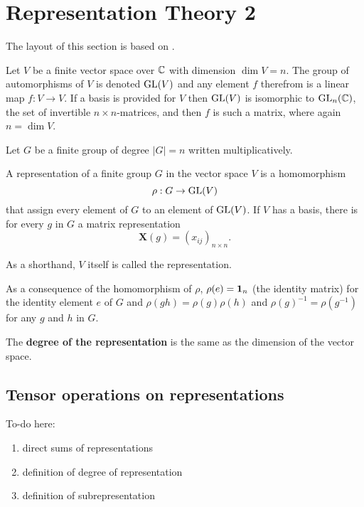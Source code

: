 	\clearpage{\thispagestyle{empty}}
\section{Representation Theory 2}

The layout of this section is based on \cite{Serre}.

Let $V$ be a finite vector space over $\mathbb{C}$ with dimension $\dim V = n$. The group of automorphisms of $V$ is denoted $\text{GL}(V)$ and any element $f$ therefrom is a linear map $f: V \rightarrow V$. If a basis is provided for $V$ then $\text{GL}(V)$ is isomorphic to $\text{GL}_n(\mathbb{C})$, the set of invertible $n \times n$-matrices, and then $f$ is such a matrix, where again $n = \dim V$\cite[18.1]{DummitFoote}.

Let $G$ be a finite group of degree $|G| = n$ written multiplicatively. 

\begin{definition}[Representation]
	A representation of a finite group $G$ in the vector space $V$ is a homomorphism 
	\[
	\rho: G \rightarrow \text{GL}(V)
	\]
	that assign every element of $G$ to an element of $\text{GL}(V)$. If $V$ has a basis, there is for every $g$ in $G$ a matrix representation
	\[
		\mathbf{X}(g) = (x_{ij})_{n \times n}.
	\]
	\begin{note}
		As a shorthand, $V$ itself is called the representation.
	\end{note}
\end{definition}

As a consequence of the homomorphism of $\rho$, $\rho(e) = \mathbf{1}_n$ (the identity matrix) for the identity element $e$ of $G$ and $\rho(gh) = \rho(g)\rho(h)$ and $\rho(g)^{-1} = \rho(g^{-1})$ for any $g$ and $h$ in $G$.

The \textbf{degree of the representation} is the same as the dimension of the vector space.

\subsection{Tensor operations on representations}
	
	To-do here:
	\begin{enumerate}
		\setlength\itemsep{-1em}
		\item direct sums of representations
		\item definition of degree of representation
		\item definition of subrepresentation
	\end{enumerate}
	
